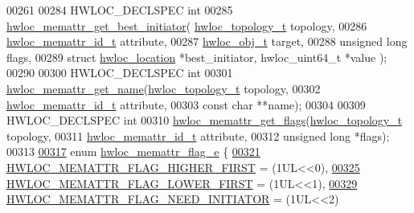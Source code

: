 \begin{DoxyCode}
00261 
00284 HWLOC\_DECLSPEC \textcolor{keywordtype}{int}
00285 \hyperlink{a00211_ga9a453879892893cf8a3fcd431ade84cd}{hwloc\_memattr\_get\_best\_initiator}(
      \hyperlink{a00186_ga9d1e76ee15a7dee158b786c30b6a6e38}{hwloc\_topology\_t} topology,
00286                                  \hyperlink{a00211_gacc82003a8610be554615995f0996c888}{hwloc\_memattr\_id\_t} attribute,
00287                                  \hyperlink{a00238}{hwloc\_obj\_t} target,
00288                                  \textcolor{keywordtype}{unsigned} \textcolor{keywordtype}{long} flags,
00289                                  \textcolor{keyword}{struct} \hyperlink{a00314}{hwloc\_location} *best\_initiator, hwloc\_uint64\_t *value
      );
00290 
00300 HWLOC\_DECLSPEC \textcolor{keywordtype}{int}
00301 \hyperlink{a00212_ga5300e9be1abdea2e00c18492148aecd0}{hwloc\_memattr\_get\_name}(\hyperlink{a00186_ga9d1e76ee15a7dee158b786c30b6a6e38}{hwloc\_topology\_t} topology,
00302                        \hyperlink{a00211_gacc82003a8610be554615995f0996c888}{hwloc\_memattr\_id\_t} attribute,
00303                        \textcolor{keyword}{const} \textcolor{keywordtype}{char} **name);
00304 
00309 HWLOC\_DECLSPEC \textcolor{keywordtype}{int}
00310 \hyperlink{a00212_ga4c62b626085adeaffb233e5f2a03a5eb}{hwloc\_memattr\_get\_flags}(\hyperlink{a00186_ga9d1e76ee15a7dee158b786c30b6a6e38}{hwloc\_topology\_t} topology,
00311                         \hyperlink{a00211_gacc82003a8610be554615995f0996c888}{hwloc\_memattr\_id\_t} attribute,
00312                         \textcolor{keywordtype}{unsigned} \textcolor{keywordtype}{long} *flags);
00313 
\hyperlink{a00212_ga78aceb4cac4d614c0f5e82dbfeb779e5}{00317} \textcolor{keyword}{enum} \hyperlink{a00212_ga78aceb4cac4d614c0f5e82dbfeb779e5}{hwloc\_memattr\_flag\_e} \{
\hyperlink{a00212_gga78aceb4cac4d614c0f5e82dbfeb779e5af29e65444a6ed00f5cc246df06f65815}{00321}   \hyperlink{a00212_gga78aceb4cac4d614c0f5e82dbfeb779e5af29e65444a6ed00f5cc246df06f65815}{HWLOC\_MEMATTR\_FLAG\_HIGHER\_FIRST} = (1UL<<0),
\hyperlink{a00212_gga78aceb4cac4d614c0f5e82dbfeb779e5a9601b5b0e1e68635e7e9901f28bd93bf}{00325}   \hyperlink{a00212_gga78aceb4cac4d614c0f5e82dbfeb779e5a9601b5b0e1e68635e7e9901f28bd93bf}{HWLOC\_MEMATTR\_FLAG\_LOWER\_FIRST} = (1UL<<1),
\hyperlink{a00212_gga78aceb4cac4d614c0f5e82dbfeb779e5a9d16523e285b2e22cfc78cc84dce8c96}{00329}   \hyperlink{a00212_gga78aceb4cac4d614c0f5e82dbfeb779e5a9d16523e285b2e22cfc78cc84dce8c96}{HWLOC\_MEMATTR\_FLAG\_NEED\_INITIATOR} = (1UL<<2)

\end{DoxyCode}
